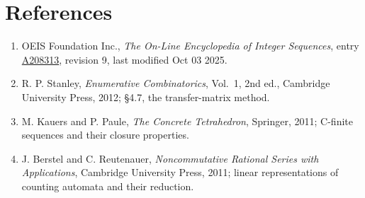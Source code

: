 \documentclass[11pt]{article}
\theoremstyle{definition}
\begin{document}
\section{References}

\begin{enumerate}

\item OEIS Foundation Inc., \emph{The On-Line Encyclopedia of Integer Sequences}, entry \href{https://oeis.org/A208313}{A208313}, revision 9, last modified Oct 03 2025.

\item R. P. Stanley, \emph{Enumerative Combinatorics}, Vol.~1, 2nd ed., Cambridge University Press, 2012; \S4.7, the transfer-matrix method.

\item M. Kauers and P. Paule, \emph{The Concrete Tetrahedron}, Springer, 2011; C-finite sequences and their closure properties.

\item J. Berstel and C. Reutenauer, \emph{Noncommutative Rational Series with Applications}, Cambridge University Press, 2011; linear representations of counting automata and their reduction.

\end{enumerate}
\end{document}
